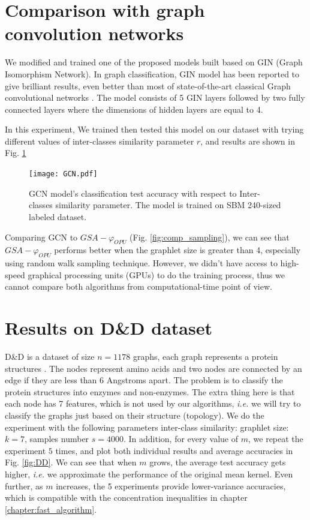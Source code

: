 \section{Comparison with graph convolution networks}
We modified and trained one of the proposed models built based on GIN (Graph Isomorphism Network). In graph classification, GIN model has been reported to give brilliant results, even better than most of state-of-the-art classical Graph convolutional networks \citep{GCN_powerful}. 
The model consists of 5 GIN layers followed by two fully connected layers where the dimensions of hidden layers are equal to 4. 

In this experiment, We trained then tested this model on our dataset with trying different values of inter-classes similarity parameter $r$, and results are shown in Fig. \ref{fig:GCN_GIN_SBM_multfactor_RW}
\begin{figure}[H]
\centering
\texttt{[image: GCN.pdf]}
\caption[GCN model's classification test accuracy as a function of Inter-classes similarity parameter ]{GCN model's classification test accuracy with respect to Inter-classes similarity parameter. The  model is trained on SBM 240-sized labeled dataset.}
\label{fig:GCN_GIN_SBM_multfactor_RW}
\end{figure}
Comparing GCN  to $GSA-\varphi_{OPU}$ (Fig. \ref{fig:comp_sampling}), we can see that $GSA-\varphi_{OPU}$ performs better when the graphlet size is greater than 4, especially using  random walk sampling technique. However, we didn't have access to high-speed graphical processing units (GPUs) to do the training process, thus we cannot compare both algorithms from computational-time point of view.

\section{Results on D\&D dataset}
D\&D is a dataset of size $n=1178$ graphs, each graph represents a protein structures \citep{DD_ref}. The nodes represent amino acids and two nodes are connected by an edge if they are less than 6 Angstroms apart. The problem  is to classify the protein structures into enzymes and non-enzymes. The extra thing here is that each node has 7 features, which is not used by our algorithms, \emph{i.e.} we will try to classify the graphs just based on their structure (topology).
We do the experiment with the following parameters inter-class similarity: graphlet size: $k=7$, samples number $s=4000$. 
In addition, for every value of $m$, we repeat the experiment $5$ times, and plot both individual results and average accuracies in Fig. \ref{fig:DD}. We can see that when $m$ grows, the average test accuracy gets higher, \emph{i.e.} we approximate the performance of the original mean kernel. Even further, as $m$ increases, the 5 experiments provide lower-variance accuracies, which is compatible with the concentration inequalities in chapter \ref{chapter:fast_algorithm}.

